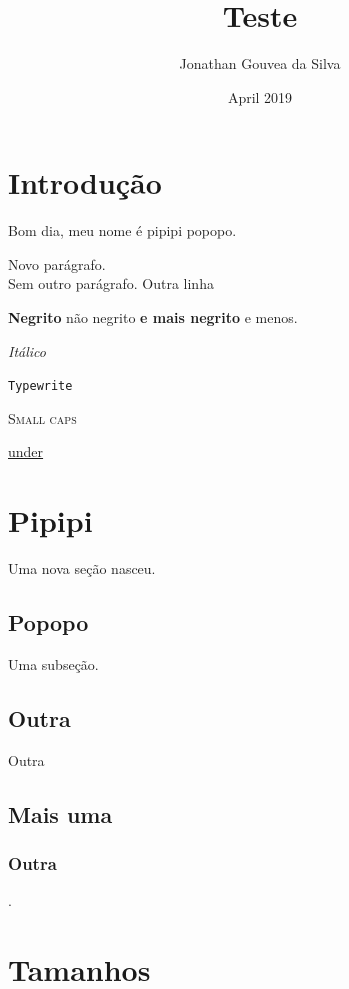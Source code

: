 \documentclass[a4paper, 12pt, oneside]{article}
\title{Teste}
\author{Jonathan Gouvea da Silva}
\date{April 2019}
\begin{document}
\maketitle

\tableofcontents
\newpage
\listoffigures
\clearpage

\section{Introdução}

Bom dia, meu nome é pipipi popopo.

Novo parágrafo. \\
Sem outro parágrafo. \newline
\newpage
Outra linha \label{marcador_outra_linha}

\textbf{Negrito} não negrito \textbf{e mais negrito} e menos.

\textit{Itálico}

\texttt{Typewrite}

\textsc{Small caps}

\underline{under}


\section{Pipipi}

Uma nova seção nasceu.

    \subsection{Popopo}
        Uma subseção.
        
    \subsection{Outra}
        Outra
        
    \subsection{Mais uma}
        \subsubsection{Outra}
            .
            
\newpage

\section{Tamanhos}
\end{document}
